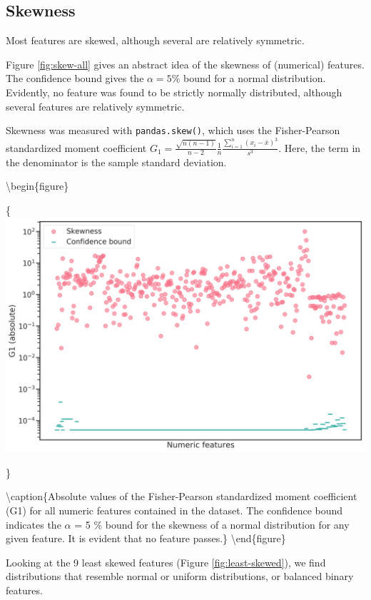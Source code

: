 \documentclass[
  11pt,
  a4paper,
  DIV=12,captions=tableheading,oneside]{scrbook}
\begin{document}
\hypertarget{skewness}{%
\subsection{Skewness}\label{skewness}}

Most features are skewed, although several are relatively symmetric.

Figure \ref{fig:skew-all} gives an abstract idea of the skewness of (numerical) features. The confidence bound gives the \(\alpha=5 \%\) bound for a normal distribution. Evidently, no feature was found to be strictly normally distributed, although several features are relatively symmetric.

Skewness was measured with \texttt{pandas.skew()}, which uses the Fisher-Pearson standardized moment coefficient \(G_1 = \frac{\sqrt{n(n-1)}}{n-2}\frac{1}{n}\frac{\sum_{i=1}^n (x_i-\bar{x})^3}{s^3}\). Here, the term in the denominator is the sample standard deviation.

\textbackslash{}begin\{figure\}

\{\centering \includegraphics[width=0.7\linewidth]{figures/eda/skewness-numeric-features}

\}

\textbackslash{}caption\{Absolute values of the Fisher-Pearson standardized moment coefficient (G1) for all numeric features contained in the dataset. The confidence bound indicates the \(\alpha\) = 5 \% bound for the skewness of a normal distribution for any given feature. It is evident that no feature passes.\}\label{fig:skew-all}
\textbackslash{}end\{figure\}

Looking at the 9 least skewed features (Figure \ref{fig:least-skewed}), we find distributions that resemble normal or uniform distributions, or balanced binary features.
\end{document}
